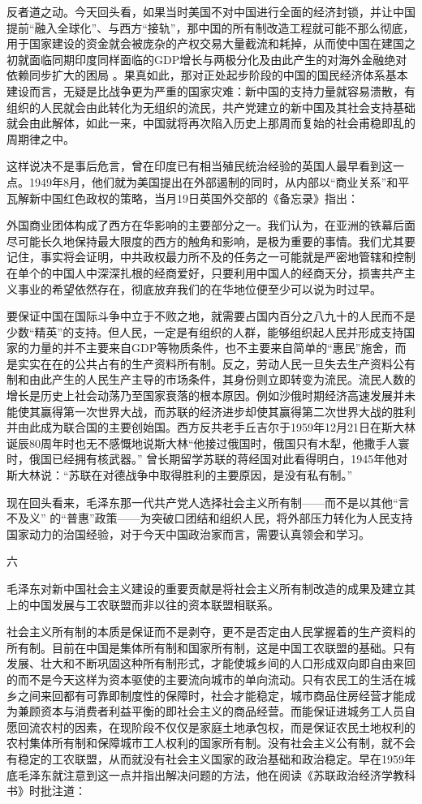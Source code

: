 \documentclass[UTF8, 12pt, a4paper]{ctexrep}
\begin{document}
反者道之动。今天回头看，如果当时美国不对中国进行全面的经济封锁，并让中国提前“融入全球化”、与西方“接轨”，那中国的所有制改造工程就可能不那么彻底，用于国家建设的资金就会被庞杂的产权交易大量截流和耗掉，从而使中国在建国之初就面临同期印度同样面临的GDP增长与两极分化及由此产生的对海外金融绝对依赖同步扩大的困局 。果真如此，那对正处起步阶段的中国的国民经济体系基本建设而言，无疑是比战争更为严重的国家灾难：新中国的支持力量就容易溃散，有组织的人民就会由此转化为无组织的流民，共产党建立的新中国及其社会支持基础就会由此解体，如此一来，中国就将再次陷入历史上那周而复始的社会甫稳即乱的周期律之中。

这样说决不是事后危言，曾在印度已有相当殖民统治经验的英国人最早看到这一点。1949年8月，他们就为美国提出在外部遏制的同时，从内部以“商业关系”和平瓦解新中国红色政权的策略，当月19日英国外交部的《备忘录》指出：

外国商业团体构成了西方在华影响的主要部分之一。我们认为，在亚洲的铁幕后面尽可能长久地保持最大限度的西方的触角和影响，是极为重要的事情。我们尤其要记住，事实将会证明，中共政权最力所不及的任务之一可能就是严密地管辖和控制在单个的中国人中深深扎根的经商爱好，只要利用中国人的经商天分，损害共产主义事业的希望依然存在，彻底放弃我们的在华地位便至少可以说为时过早。

要保证中国在国际斗争中立于不败之地，就需要占国内百分之八九十的人民而不是少数“精英”的支持。但人民，一定是有组织的人群，能够组织起人民并形成支持国家的力量的并不主要来自GDP等物质条件，也不主要来自简单的“惠民”施舍，而是实实在在的公共占有的生产资料所有制。反之，劳动人民一旦失去生产资料公有制和由此产生的人民生产主导的市场条件，其身份则立即转变为流民。流民人数的增长是历史上社会动荡乃至国家衰落的根本原因。例如沙俄时期经济高速发展并未能使其赢得第一次世界大战，而苏联的经济进步却使其赢得第二次世界大战的胜利并由此成为联合国的主要创始国。西方反共老手丘吉尔于1959年12月21日在斯大林诞辰80周年时也无不感慨地说斯大林“他接过俄国时，俄国只有木犁，他撒手人寰时，俄国已经拥有核武器。” 曾长期留学苏联的蒋经国对此看得明白，1945年他对斯大林说：“苏联在对德战争中取得胜利的主要原因，是没有私有制。”

现在回头看来，毛泽东那一代共产党人选择社会主义所有制——而不是以其他“言不及义” 的“普惠”政策——为突破口团结和组织人民，将外部压力转化为人民支持国家动力的治国经验，对于今天中国政治家而言，需要认真领会和学习。

六

毛泽东对新中国社会主义建设的重要贡献是将社会主义所有制改造的成果及建立其上的中国发展与工农联盟而非以往的资本联盟相联系。

社会主义所有制的本质是保证而不是剥夺，更不是否定由人民掌握着的生产资料的所有制。目前在中国是集体所有制和国家所有制，这是中国工农联盟的基础。只有发展、壮大和不断巩固这种所有制形式，才能使城乡间的人口形成双向即自由来回的而不是今天这样为资本驱使的主要流向城市的单向流动。只有农民工的生活在城乡之间来回都有可靠即制度性的保障时，社会才能稳定，城市商品住房经营才能成为兼顾资本与消费者利益平衡的即社会主义的商品经营。而能保证进城务工人员自愿回流农村的因素，在现阶段不仅仅是家庭土地承包权，而是保证农民土地权利的农村集体所有制和保障城市工人权利的国家所有制。没有社会主义公有制，就不会有稳定的工农联盟，从而就没有社会主义国家的政治基础和政治稳定。早在1959年底毛泽东就注意到这一点并指出解决问题的方法，他在阅读《苏联政治经济学教科书》时批注道：
\end{document}

